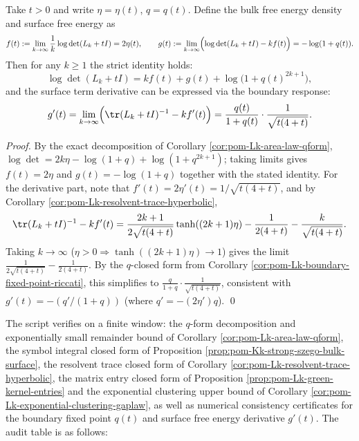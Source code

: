 \begin{corollary}\label{cor:pom-Lk-surface-free-energy}
Take \(t>0\) and write \(\eta=\eta(t)\), \(q=q(t)\).
Define the bulk free energy density and surface free energy as
\[
f(t):=\lim_{k\to\infty}\frac{1}{k}\log\det(L_k+tI)=2\eta(t),
\qquad
g(t):=\lim_{k\to\infty}\Bigl(\log\det(L_k+tI)-k f(t)\Bigr)=-\log(1+q(t)).
\]
Then for any \(k\ge 1\) the strict identity holds:
\[
\log\det(L_k+tI)=k f(t)+g(t)+\log\bigl(1+q(t)^{2k+1}\bigr),
\]
and the surface term derivative can be expressed via the boundary response:
\[
g'(t)=\lim_{k\to\infty}\Bigl(\tr(L_k+tI)^{-1}-k f'(t)\Bigr)
=\frac{q(t)}{1+q(t)}\cdot \frac{1}{\sqrt{t(4+t)}}.
\]
\end{corollary}
\begin{proof}
By the exact decomposition of Corollary \ref{cor:pom-Lk-area-law-qform},
\(
\log\det=2k\eta-\log(1+q)+\log(1+q^{2k+1})
\); taking limits gives \(f(t)=2\eta\) and \(g(t)=-\log(1+q)\) together with the stated identity.
For the derivative part, note that \(f'(t)=2\eta'(t)=1/\sqrt{t(4+t)}\), and by Corollary \ref{cor:pom-Lk-resolvent-trace-hyperbolic},
\[
\tr(L_k+tI)^{-1}-k f'(t)
=\frac{2k+1}{2\sqrt{t(4+t)}}\tanh((2k+1)\eta)-\frac{1}{2(4+t)}-\frac{k}{\sqrt{t(4+t)}}.
\]
Taking \(k\to\infty\) (\(\eta>0\Rightarrow\tanh((2k+1)\eta)\to 1\)) gives the limit
\(
\frac{1}{2\sqrt{t(4+t)}}-\frac{1}{2(4+t)}
\).
By the \(q\)-closed form from Corollary \ref{cor:pom-Lk-boundary-fixed-point-riccati}, this simplifies to
\(
\frac{q}{1+q}\cdot \frac{1}{\sqrt{t(4+t)}}
\), consistent with \(g'(t)=-(q'/(1+q))\) (where \(q'=-(2\eta')q\)). \qed
\end{proof}
\begin{remark}\label{rem:pom-fence-green-kernel-area-law-audit}
The script verifies on a finite window: the \(q\)-form decomposition and exponentially small remainder bound of Corollary \ref{cor:pom-Lk-area-law-qform},
the symbol integral closed form of Proposition \ref{prop:pom-Kk-strong-szego-bulk-surface},
the resolvent trace closed form of Corollary \ref{cor:pom-Lk-resolvent-trace-hyperbolic},
the matrix entry closed form of Proposition \ref{prop:pom-Lk-green-kernel-entries} and the exponential clustering upper bound of Corollary \ref{cor:pom-Lk-exponential-clustering-gaplaw},
as well as numerical consistency certificates for the boundary fixed point \(q(t)\) and surface free energy derivative \(g'(t)\).
The audit table is as follows:

\end{remark}


